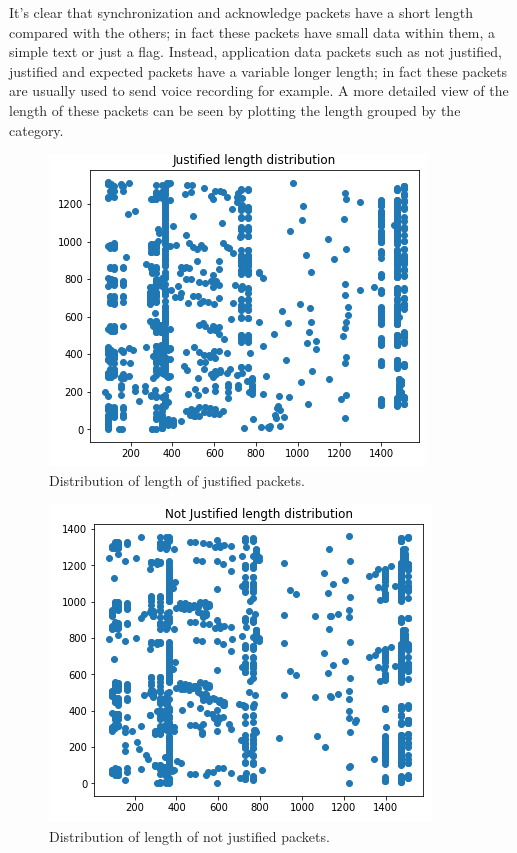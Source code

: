\documentclass[sigconf]{acmart}
\begin{document}
    It's clear that synchronization and acknowledge packets have a short length compared with the others; in fact these packets have small data within them, a simple text or just a flag.
    Instead, application data packets such as not justified, justified and expected packets have a variable longer length; in fact these packets are usually used to send voice recording for example.
    A more detailed view of the length of these packets can be seen by plotting the length grouped by the category.
    \begin{figure}[h!]
        \includegraphics[width=0.8\linewidth]{img/justified_distribution.png}
        \caption{Distribution of length of justified packets.}
        \label{fig:justified_distribution}
    \end{figure}
    \begin{figure}[h!]
        \includegraphics[width=0.8\linewidth]{img/not_justified_distribution.png}
        \caption{Distribution of length of not justified packets.}
        \label{fig:not_justified_distribution}
    \end{figure}
\end{document}
